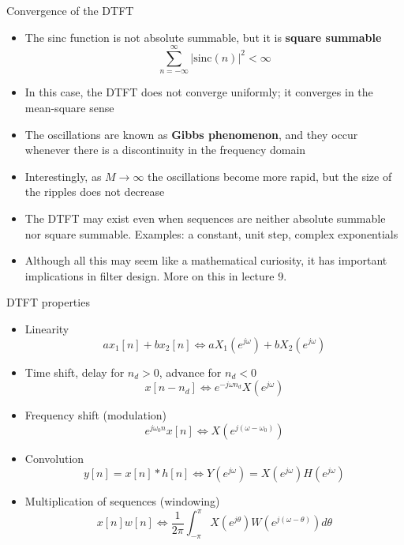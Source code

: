 \documentclass[10pt, handout]{beamer}
\begin{document}
%
\begin{frame}{Convergence of the DTFT}
\begin{itemize}
	\item The sinc function is not absolute summable, but it is \textbf{square summable}
	\begin{equation*}
		\sum_{n=-\infty}^{\infty} |\mathrm{sinc}(n)|^2 < \infty
	\end{equation*}
	\item In this case, the DTFT does not converge uniformly; it converges in the mean-square sense
	\item The oscillations are known as \textbf{Gibbs phenomenon}, and they occur whenever there is a discontinuity in the frequency domain
	\item Interestingly, as $M\to\infty$ the oscillations become more rapid, but the size of the ripples does not decrease
	\item The DTFT may exist even when sequences are neither absolute summable nor square summable. Examples: a constant, unit step, complex exponentials
	\item Although all this may seem like a mathematical curiosity, it has important implications in filter design. More on this in lecture 9.
\end{itemize}
	
\end{frame}

%
\begin{frame}{DTFT properties}
\begin{itemize}
\item Linearity
	\begin{equation*}
	ax_1[n]  + bx_2[n] \Longleftrightarrow aX_1(e^{j\omega})+bX_2(e^{j\omega})
	\end{equation*}
\item Time shift, delay for $n_d > 0$, advance for $n_d < 0$
	\begin{equation*}
	x[n-n_d] \Longleftrightarrow e^{-j\omega n_d}X(e^{j\omega})
	\end{equation*}
\item Frequency shift (modulation)
	\begin{equation*}
	e^{j\omega_0n}x[n] \Longleftrightarrow X(e^{j(\omega-\omega_0)})
	\end{equation*}
\item Convolution
	\begin{equation*}
	y[n] = x[n]\ast h[n] \Longleftrightarrow Y(e^{j\omega}) = X(e^{j\omega})H(e^{j\omega})
	\end{equation*}
\item Multiplication of sequences (windowing)
	\begin{equation*}
	x[n]w[n] \Longleftrightarrow \frac{1}{2\pi}\int_{-\pi}^{\pi}X(e^{j\theta})W(e^{j(\omega-\theta)}){d\theta}
	\end{equation*}
\end{itemize}
\end{frame}
\end{document}
